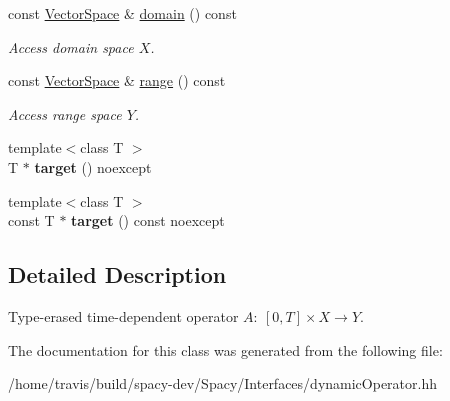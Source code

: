 \begin{DoxyCompactItemize}
\item 
\hypertarget{classSpacy_1_1DynamicOperator_ad457cb5571c721f97530895aa26af626}{const \hyperlink{classSpacy_1_1VectorSpace}{Vector\-Space} \& \hyperlink{classSpacy_1_1DynamicOperator_ad457cb5571c721f97530895aa26af626}{domain} () const }\label{classSpacy_1_1DynamicOperator_ad457cb5571c721f97530895aa26af626}

\begin{DoxyCompactList}\small\item\em Access domain space $X$. \end{DoxyCompactList}\item 
\hypertarget{classSpacy_1_1DynamicOperator_ab760994d921fa8d9df2882f9e4cfc9c3}{const \hyperlink{classSpacy_1_1VectorSpace}{Vector\-Space} \& \hyperlink{classSpacy_1_1DynamicOperator_ab760994d921fa8d9df2882f9e4cfc9c3}{range} () const }\label{classSpacy_1_1DynamicOperator_ab760994d921fa8d9df2882f9e4cfc9c3}

\begin{DoxyCompactList}\small\item\em Access range space $Y$. \end{DoxyCompactList}\item 
\hypertarget{classSpacy_1_1DynamicOperator_a6d9ebf222c06c54000c0ecb3ec3b7769}{{\footnotesize template$<$class T $>$ }\\T $\ast$ {\bfseries target} () noexcept}\label{classSpacy_1_1DynamicOperator_a6d9ebf222c06c54000c0ecb3ec3b7769}

\item 
\hypertarget{classSpacy_1_1DynamicOperator_a47418fa10f47b00a8338983195372735}{{\footnotesize template$<$class T $>$ }\\const T $\ast$ {\bfseries target} () const noexcept}\label{classSpacy_1_1DynamicOperator_a47418fa10f47b00a8338983195372735}

\end{DoxyCompactItemize}


\subsection{Detailed Description}
Type-\/erased time-\/dependent operator $A:\ [0,T] \times X \to Y $. 

The documentation for this class was generated from the following file\-:\begin{DoxyCompactItemize}
\item 
/home/travis/build/spacy-\/dev/\-Spacy/\-Interfaces/dynamic\-Operator.\-hh\end{DoxyCompactItemize}
